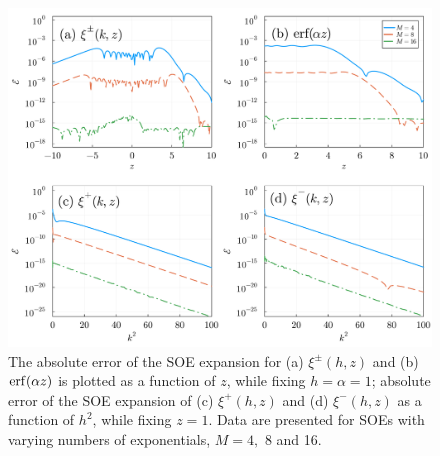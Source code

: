 \begin{figure}[ht] 
	\centering
	\includegraphics[width=\textwidth]{figs/fig_error_Uxi.pdf}
	\caption{
		The absolute error of the SOE expansion for (a) $\xi^{\pm}(h,z)$ and (b) $\operatorname{erf}(\alpha z)$ is plotted as a function of $z$, while fixing $h=\alpha=1$; absolute error of the SOE expansion of (c) $\xi^{+}(h,z)$ and (d) $\xi^{-}(h,z)$ as a function of $h^2$, while fixing $z=1$.
		Data are presented for SOEs with varying numbers of exponentials, $M=4,$ 8 and 16.
	}
	\label{fig:error_SOE}
\end{figure}


